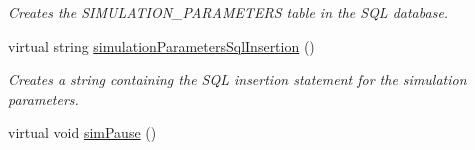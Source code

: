 \begin{DoxyCompactItemize}
\begin{DoxyCompactList}\small\item\em Creates the S\+I\+M\+U\+L\+A\+T\+I\+O\+N\+\_\+\+P\+A\+R\+A\+M\+E\+T\+E\+RS table in the S\+QL database. \end{DoxyCompactList}\item 
virtual string \hyperlink{class_tree_aed6504b4f759fb31fdeb61cd03b2b3f9}{simulation\+Parameters\+Sql\+Insertion} ()
\begin{DoxyCompactList}\small\item\em Creates a string containing the S\+QL insertion statement for the simulation parameters. \end{DoxyCompactList}\item 
virtual void \hyperlink{class_tree_ae5308f74e982485ac444aa394b952152}{sim\+Pause} ()\hypertarget{class_tree_ae5308f74e982485ac444aa394b952152}{}\label{class_tree_ae5308f74e982485ac444aa394b952152}


\end{DoxyCompactItemize}
